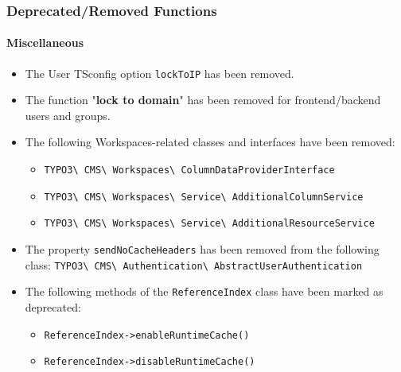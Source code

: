 %

\begin{frame}[fragile]
	\frametitle{Deprecated/Removed Functions}
	\framesubtitle{Miscellaneous}

	\begin{itemize}
		\item The User TSconfig option \texttt{lockToIP} has been removed.
		\item The function "\textbf{lock to domain}" has been removed for frontend/backend
			users and groups.
		\item The following Workspaces-related classes and interfaces have been removed:
			\begin{itemize}\smaller
				\item \texttt{TYPO3\textbackslash
					CMS\textbackslash
					Workspaces\textbackslash
					ColumnDataProviderInterface}
				\item \texttt{TYPO3\textbackslash
					CMS\textbackslash
					Workspaces\textbackslash
					Service\textbackslash
					AdditionalColumnService}
				\item \texttt{TYPO3\textbackslash
					CMS\textbackslash
					Workspaces\textbackslash
					Service\textbackslash
					AdditionalResourceService}
			\end{itemize}\normalsize

		\item The property \texttt{sendNoCacheHeaders} has been removed from the following class:\newline
			\smaller\texttt{TYPO3\textbackslash
				CMS\textbackslash
				Authentication\textbackslash
				AbstractUserAuthentication}\normalsize

		\item The following methods of the \texttt{ReferenceIndex} class have been marked as deprecated:

			\begin{itemize}\smaller
				\item \texttt{ReferenceIndex->enableRuntimeCache()}
				\item \texttt{ReferenceIndex->disableRuntimeCache()}
			\end{itemize}\normalsize

	\end{itemize}

\end{frame}


